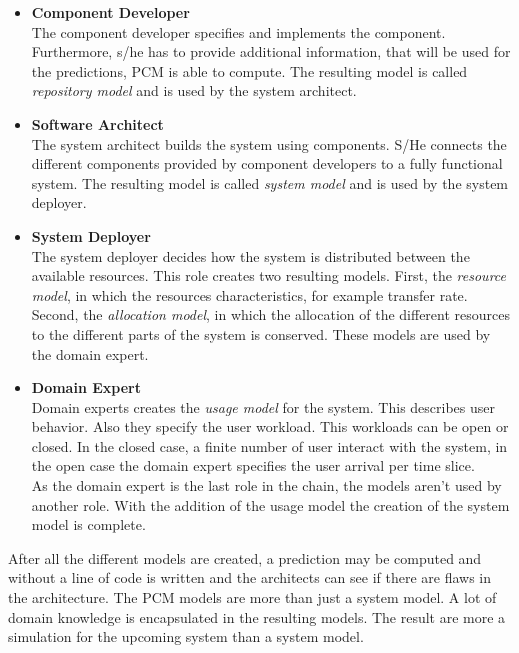 \begin{itemize}
\item \textbf{Component Developer}\\
The component developer specifies and implements the component. Furthermore, s/he has to provide additional information, that will be used for the predictions, PCM is able to compute. The resulting model is called \textit{repository model} and is used by the system architect.
\item \textbf{Software Architect}\\
The system architect builds the system using components. S/He connects the different components provided by component developers to a fully functional system. The resulting model is called \textit{system model} and is used by the system deployer.
\item \textbf{System Deployer}\\
The system deployer decides  how the system is distributed between the available resources. 
This role creates two resulting models. First, the \textit{resource model}, in which the resources characteristics, for example transfer rate. Second, the \textit{allocation model}, in which the allocation of the different resources to the different parts of the system is conserved. These models are used by the domain expert.
\item \textbf{Domain Expert}\\
Domain experts creates the \textit{usage model} for the system. This describes user behavior. Also they specify the user workload. This workloads can be open or closed. In the closed case, a finite number of user interact with the system, in the open case the domain expert specifies the user arrival per time slice.\\
As the domain expert is the last role in the chain, the models aren't used by another role. With the addition of the usage model the creation of the system model is complete.
\end{itemize}

After all the different models are created, a prediction may be computed and without a line of code is written and the architects can see if there are flaws in the architecture. The PCM models are more than just a system model. A lot of domain knowledge is encapsulated in the resulting models. The result are more a simulation for the upcoming system than a system model.
